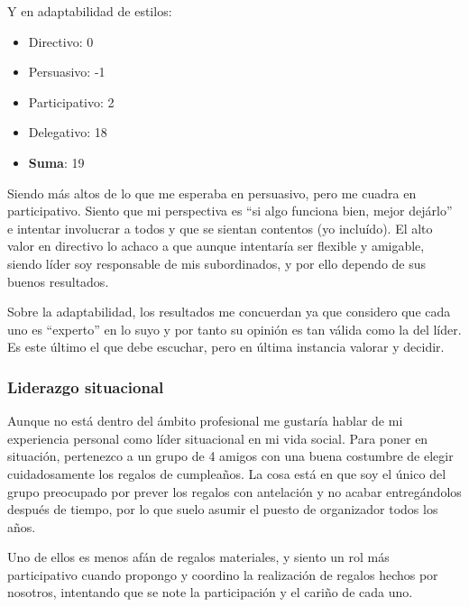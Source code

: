 Y en adaptabilidad de estilos:
\begin{itemize}
    \item Directivo: 0
    \item Persuasivo: -1
    \item Participativo: 2
    \item Delegativo: 18
    \item \textbf{Suma}: 19
\end{itemize}

Siendo más altos de lo que me esperaba en persuasivo, pero me cuadra en participativo. Siento que mi perspectiva es ``si algo funciona bien, mejor dejárlo'' e intentar involucrar a todos y que se sientan contentos (yo incluído). El alto valor en directivo lo achaco a que aunque intentaría ser flexible y amigable, siendo líder soy responsable de mis subordinados, y por ello dependo de sus buenos resultados.

Sobre la adaptabilidad, los resultados me concuerdan ya que considero que cada uno es ``experto'' en lo suyo y por tanto su opinión es tan válida como la del líder. Es este último el que debe escuchar, pero en última instancia valorar y decidir.

\subsubsection{Liderazgo situacional}


Aunque no está dentro del ámbito profesional me gustaría hablar de mi experiencia personal como líder situacional en mi vida social. 
Para poner en situación, pertenezco a un grupo de 4 amigos con una buena costumbre de elegir cuidadosamente los regalos de cumpleaños. La cosa está en que soy el único del grupo preocupado por prever los regalos con antelación y no acabar entregándolos después de tiempo, por lo que suelo asumir el puesto de organizador todos los años.

\vspace{\baselineskip}

Uno de ellos es menos afán de regalos materiales, y siento un rol más participativo cuando propongo y coordino la realización de regalos hechos por nosotros, intentando que se note la participación y el cariño de cada uno.

